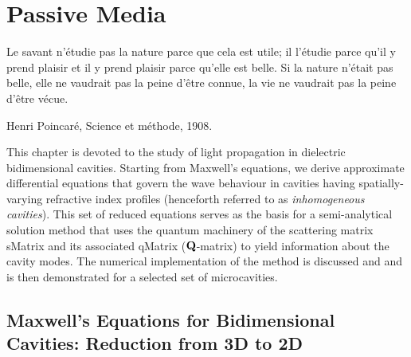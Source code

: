 \chapter{Passive Media}
\epigraph{
Le savant n'étudie pas la nature parce que cela est utile; il l'étudie parce qu'il y prend plaisir 
et il y prend plaisir parce qu'elle est belle. Si la nature n'était pas belle, elle ne vaudrait 
pas la peine d'être connue, la vie ne vaudrait pas la peine d'être vécue. 
}
{Henri Poincaré, Science et méthode, 1908.}

This chapter is devoted to the study of light propagation in 
dielectric bidimensional cavities. Starting from Maxwell's equations, 
we derive approximate differential equations that govern 
the wave behaviour in cavities having spatially-varying 
refractive index profiles (henceforth referred to as 
\textit{inhomogeneous cavities}). This set of reduced equations
serves as the basis for a semi-analytical solution method 
that uses the quantum machinery of the scattering matrix \gls{sMatrix}
and its associated \gls{qMatrix} ($\mathbf{Q}$-matrix) to yield information
about the cavity modes. The numerical implementation of the
method is discussed and and is then demonstrated for a selected
set of microcavities. 

\section{Maxwell's Equations for Bidimensional Cavities: Reduction from 3D to 2D}

